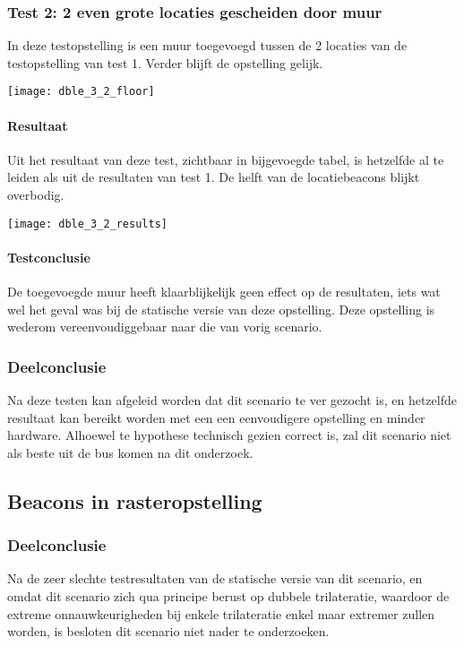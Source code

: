 \subsubsection{Test 2: 2 even grote locaties gescheiden door muur}
\begin{minipage}{0.55\textwidth}
In deze testopstelling is een muur toegevoegd tussen de 2 locaties van de testopstelling van test 1. Verder blijft de opstelling gelijk.
\end{minipage}
\hfill
\begin{minipage}{0.42\textwidth}
	\texttt{[image: dble\_3\_2\_floor]}
\end{minipage}

\paragraph{Resultaat}
\begin{minipage}{0.42\textwidth}
Uit het resultaat van deze test, zichtbaar in bijgevoegde tabel, is hetzelfde al te leiden als uit de resultaten van test 1. De helft van de locatiebeacons blijkt overbodig.
\end{minipage}
\hfill
\begin{minipage}{0.55\textwidth}
	\texttt{[image: dble\_3\_2\_results]}
\end{minipage}

\paragraph{Testconclusie}
De toegevoegde muur heeft klaarblijkelijk geen effect op de resultaten, iets wat wel het geval was bij de statische versie van deze opstelling. Deze opstelling is wederom vereenvoudiggebaar naar die van vorig scenario.

\subsubsection{Deelconclusie}
Na deze testen kan afgeleid worden dat dit scenario te ver gezocht is, en hetzelfde resultaat kan bereikt worden met een een eenvoudigere opstelling en minder hardware. Alhoewel te hypothese technisch gezien correct is, zal dit scenario niet als beste uit de bus komen na dit onderzoek.

\subsection{Beacons in rasteropstelling}
\subsubsection{Deelconclusie}
Na de zeer slechte testresultaten van de statische versie van dit scenario, en omdat dit scenario zich qua principe berust op dubbele trilateratie, waardoor de extreme onnauwkeurigheden bij enkele trilateratie enkel maar extremer zullen worden, is besloten dit scenario niet nader te onderzoeken.

